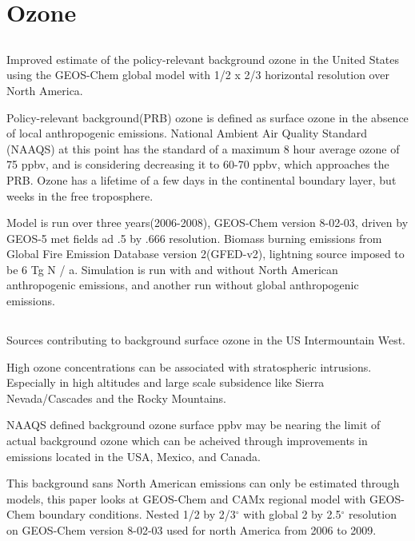 \section{Ozone}

\subsection{\cite{Zhang_2011}}
Improved estimate of the policy-relevant background ozone in the United States using the GEOS-Chem global model with 1/2 x 2/3 horizontal resolution over North America.

Policy-relevant background(PRB) ozone is defined as surface ozone in the absence of local anthropogenic emissions.
National Ambient Air Quality Standard (NAAQS) at this point has the standard of a maximum  8 hour average ozone of 75 ppbv, and is considering decreasing it to 60-70 ppbv, which approaches the PRB. Ozone has a lifetime of a few days in the continental boundary layer, but weeks in the free troposphere.

Model is run over three years(2006-2008), GEOS-Chem version 8-02-03, driven by GEOS-5 met fields ad .5 by .666 resolution. Biomass burning emissions from Global Fire Emission Database version 2(GFED-v2), lightning source imposed to be 6 Tg N / a.
Simulation is run with and without North American anthropogenic emissions, and another run without global anthropogenic emissions.

\subsection{\cite{Zhang_2014}}
Sources contributing to background surface ozone in the US
Intermountain West.


High ozone concentrations can be associated with stratospheric intrusions.
Especially in high altitudes and large scale subsidence like Sierra Nevada/Cascades and the Rocky Mountains.

NAAQS defined background ozone surface ppbv may be nearing the limit of actual background ozone which can be acheived through improvements in emissions located in the USA, Mexico, and Canada.

This background sans North American emissions can only be estimated through models, this paper looks at GEOS-Chem and CAMx regional model with GEOS-Chem boundary conditions.
Nested 1/2 by 2/3$^{\circ}$ with global 2 by 2.5$^{\circ}$ resolution on GEOS-Chem version 8-02-03 used for north America from 2006 to 2009.


